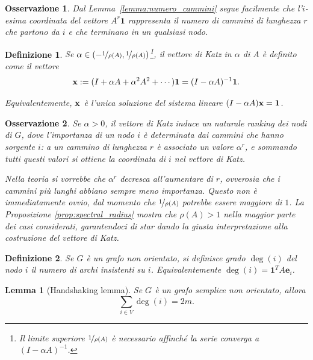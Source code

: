 \documentclass[a4paper]{article}
\newcommand{\xvec}{{\bf x}}
\newcommand{\bone}{\mathbf{1}}
\newcommand{\inv}{^{-1}}
\newtheorem{lemma}{Lemma}
\newtheorem{definition}{Definizione}
\newtheorem{remark}{Osservazione}
\begin{document}
\begin{remark}
    \label{remark:molt_per_1}
    Dal Lemma~\ref{lemma:numero_cammini} segue facilmente che l'$i$-esima
    coordinata del vettore $A^r \bone$ rappresenta il numero di cammini
    di lunghezza $r$ che partono da $i$ e che terminano in un qualsiasi nodo.
\end{remark}

\begin{definition} Se $\alpha \in (-\nicefrac{1}{\rho(A)}, \nicefrac{1}{\rho(A)})$\footnote{Il limite superiore $\nicefrac{1}{\rho(A)}$ è necessario affinché la serie converga a $(I-\alpha A)\inv$.}, {\rm il vettore di Katz in $\alpha$ di $A$} è definito come il vettore
\[
    \xvec := (I + \alpha A + \alpha^2A^2+\cdots) \bone = (I-\alpha A)\inv \bone.
\]

Equivalentemente, $\xvec$ è l'unica soluzione del sistema lineare $(I-\alpha A)\xvec = \bone$.
\end{definition}

\begin{remark}
    Se $\alpha > 0$, il vettore di Katz induce un naturale ranking dei nodi di $G$, dove l'importanza
    di un nodo $i$ è determinata dai cammini che hanno sorgente $i$: a
    un cammino di lunghezza $r$ è associato un valore $\alpha^r$,
    e sommando tutti questi valori si ottiene la coordinata di $i$
    nel vettore di Katz.

    Nella teoria si vorrebbe che $\alpha^r$ decresca all'aumentare di $r$,
    ovverosia che i cammini più lunghi abbiano sempre meno importanza.
    Questo non è immediatamente ovvio, dal momento che $\nicefrac{1}{\rho(A)}$ potrebbe essere maggiore di $1$. La {\rm Proposizione
    \ref{prop:spectral_radius}} mostra che $\rho(A) > 1$ nella maggior
    parte dei casi considerati, garantendoci di star dando la giusta
    interpretazione alla costruzione del vettore di Katz.
\end{remark}

\begin{definition}
    Se $G$ è un grafo non orientato, si definisce {\rm grado} $\deg(i)$
    del nodo $i$ il numero di archi insistenti su $i$. Equivalentemente
    $\deg(i) = \bone^T A \mathbf{e}_i$.
\end{definition}

\begin{lemma}[Handshaking lemma]
    \label{lemma:handshake}
    Se $G$ è un grafo semplice non orientato, allora
    \[ \sum_{i \in V} \deg(i) = 2m. \]
\end{lemma}
\end{document}

